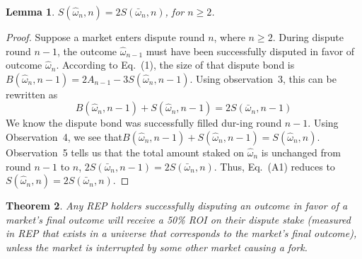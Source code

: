 \documentclass[12pt,floatfix,reprint,nofootinbib,amsmath,amssymb,epsfig,pre,floats,letterpaper,groupedaffiliation]{revtex4-1}
\newtheorem{theorem}{Theorem}
\newtheorem{lemma}[theorem]{Lemma}
\theoremstyle{definition}
\theoremstyle{definition}
\begin{document}
\begin{lemma}
$S(\hat{\omega}_n, n) = 2S(\bar{\omega}_n, n)$, for $n \geq 2$.
\end{lemma}

\begin{proof}
Suppose a market enters dispute round $n$, where $n \geq 2$. During dispute round $n-1$, the outcome $\hat{\omega}_{n-1}$ must have been successfully disputed in favor of outcome $\hat{\omega}_n$. According to Eq.~(1), the size of that dispute bond is\linebreak $B(\hat{\omega}_n, n-1) = 2A_{n-1} - 3S(\hat{\omega}_n, n-1)$. Using observation\linebreak~3, this can be rewritten as
\[
B(\hat{\omega}_n, n-1) + S(\hat{\omega}_n, n-1) = 2S(\bar{\omega}_n, n-1)\tag{A1}
\]
We know the dispute bond was successfully filled dur-\linebreak ing round $n-1$. Using Observation~4, we see that\linebreak $B(\hat{\omega}_n, n-1) + S(\hat{\omega}_n, n-1) = S(\hat{\omega}_n, n)$. Observation~5 tells us that the total amount staked on $\hat{\omega}_n$ is unchanged from round $n-1$ to $n$, $2S(\bar{\omega}_n, n-1) = 2S(\bar{\omega}_n, n)$. Thus, Eq.~(A1) reduces to $S(\hat{\omega}_n, n) = 2S(\bar{\omega}_n, n)$.
\end{proof}

\begin{theorem}
Any REP holders successfully disputing an outcome in favor of a market's final outcome will receive a 50\% ROI on their dispute stake (measured in REP that exists in a universe that corresponds to the market's final outcome), unless the market is interrupted by some other market causing a fork.
\end{theorem}
\end{document}
